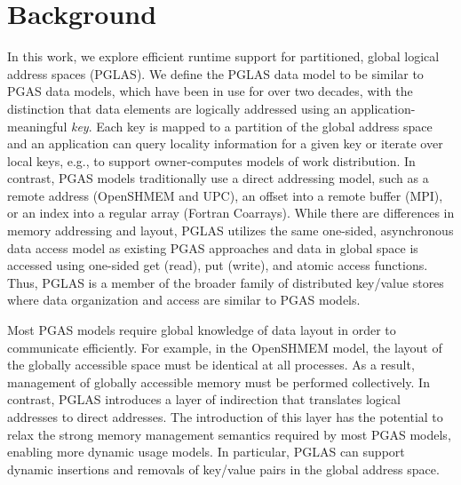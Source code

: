 \section{Background}

In this work, we explore efficient runtime support for partitioned, global
logical address spaces (PGLAS).  We define the PGLAS data model to be similar
to PGAS data models, which have been in use for over two decades, with the
distinction that data elements are logically addressed using an
application-meaningful {\em key}.  Each key is mapped to a partition of the
global address space and an application can query locality information for a
given key or iterate over local keys, e.g., to support owner-computes models of
work distribution.  In contrast, PGAS models traditionally use a direct
addressing model, such as a remote address (OpenSHMEM and UPC), an offset into
a remote buffer (MPI), or an index into a regular array (Fortran Coarrays).
While there are differences in memory addressing and layout, PGLAS utilizes the
same one-sided, asynchronous data access model as existing PGAS approaches and
data in global space is accessed using one-sided get (read), put
(write), and atomic access functions.  Thus, PGLAS is a member of the broader
family of distributed key/value stores where data organization and access are
similar to PGAS models.

Most PGAS models require global knowledge of data layout in order to
communicate efficiently.  For example, in the OpenSHMEM model, the layout of
the globally accessible space must be identical at all processes.  As a result,
management of globally accessible memory must be performed collectively.  In
contrast, PGLAS introduces a layer of indirection that translates logical
addresses to direct addresses.  The introduction of this layer
has the potential to relax the strong memory management semantics required by
most PGAS models, enabling more dynamic usage models.  In particular, PGLAS can
support dynamic insertions and removals of key/value pairs in the global
address space.

